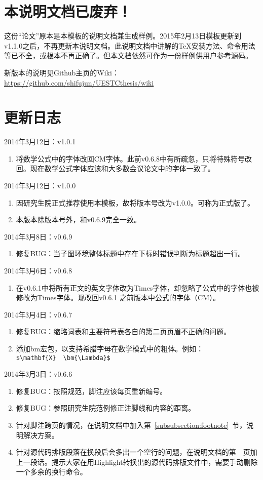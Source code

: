 \chapter{本说明文档已废弃！}
这份“论文”原本是本模板的说明文档兼生成样例。2015年2月13日模板更新到v1.1.0之后，不再更新本说明文档。此说明文档中讲解的TeX安装方法、命令用法等已不全，或根本不再正确了。但本文档依然可作为一份样例供用户参考源码。

新版本的说明见Github主页的Wiki：\url{https://github.com/shifujun/UESTCthesis/wiki}
\chapter{更新日志}
\noindent
2014年3月12日：v1.0.1
\begin{enumerate}
\item 将数学公式中的字体改回CM字体。此前v0.6.8中有所疏忽，只将特殊符号改回。现在数学公式字体应该和大多数会议论文中的字体一致了。
\end{enumerate}

\noindent
2014年3月12日：v1.0.0
\begin{enumerate}
\item 因研究生院正式推荐使用本模板，故将版本号改为v1.0.0。可称为正式版了。
\item 本版本除版本号外，和v0.6.9完全一致。
\end{enumerate}

\noindent
2014年3月8日：v0.6.9
\begin{enumerate}
\item 修复BUG：当子图环境整体标题中存在下标时错误判断为标题超出一行。
\end{enumerate}

\noindent
2014年3月6日：v0.6.8
\begin{enumerate}
\item 在v0.6.1中将所有正文的英文字体改为Times字体，却忽略了公式中的字体也被修改为Times字体。现改回v0.6.1 之前版本中公式的字体（CM）。
\end{enumerate}

\noindent
2014年3月4日：v0.6.7
\begin{enumerate}
\item 修复BUG：缩略词表和主要符号表各自的第二页页眉不正确的问题。
\item 添加bm宏包，以支持希腊字母在数学模式中的粗体。例如：\\ \verb|$\mathbf{X}  \bm{\Lambda}$|
\end{enumerate}

\noindent
2014年3月3日：v0.6.6
\begin{enumerate}
\item 修复BUG：按照规范，脚注应该每页重新编号。
\item 修复BUG：参照研究生院范例修正注脚线和内容的距离。
\item 针对脚注跨页的情况，在说明文档中加入第~\ref{subsubsection:footnote}~节，说明解决方案。
\item 针对源代码排版段落在换段后会多出一个空行的问题，在说明文档的第~\pageref{par:scrextraline}~页加上一段话。提示大家在用Highlight转换出的源代码排版文件中，需要手动删除一个多余的换行命令。
\end{enumerate}

